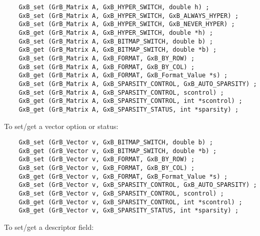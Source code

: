 \documentclass[12pt]{article}
\begin{document}
    {\footnotesize
    \begin{verbatim}
    GxB_set (GrB_Matrix A, GxB_HYPER_SWITCH, double h) ;
    GxB_set (GrB_Matrix A, GxB_HYPER_SWITCH, GxB_ALWAYS_HYPER) ;
    GxB_set (GrB_Matrix A, GxB_HYPER_SWITCH, GxB_NEVER_HYPER) ;
    GxB_get (GrB_Matrix A, GxB_HYPER_SWITCH, double *h) ;
    GxB_set (GrB_Matrix A, GxB_BITMAP_SWITCH, double b) ;
    GxB_get (GrB_Matrix A, GxB_BITMAP_SWITCH, double *b) ;
    GxB_set (GrB_Matrix A, GxB_FORMAT, GxB_BY_ROW) ;
    GxB_set (GrB_Matrix A, GxB_FORMAT, GxB_BY_COL) ;
    GxB_get (GrB_Matrix A, GxB_FORMAT, GxB_Format_Value *s) ;
    GxB_set (GrB_Matrix A, GxB_SPARSITY_CONTROL, GxB_AUTO_SPARSITY) ;
    GxB_set (GrB_Matrix A, GxB_SPARSITY_CONTROL, scontrol) ;
    GxB_get (GrB_Matrix A, GxB_SPARSITY_CONTROL, int *scontrol) ;
    GxB_get (GrB_Matrix A, GxB_SPARSITY_STATUS, int *sparsity) ; \end{verbatim} }

\noindent
To set/get a vector option or status:

    {\footnotesize
    \begin{verbatim}
    GxB_set (GrB_Vector v, GxB_BITMAP_SWITCH, double b) ;
    GxB_get (GrB_Vector v, GxB_BITMAP_SWITCH, double *b) ;
    GxB_set (GrB_Vector v, GxB_FORMAT, GxB_BY_ROW) ;
    GxB_set (GrB_Vector v, GxB_FORMAT, GxB_BY_COL) ;
    GxB_get (GrB_Vector v, GxB_FORMAT, GxB_Format_Value *s) ;
    GxB_set (GrB_Vector v, GxB_SPARSITY_CONTROL, GxB_AUTO_SPARSITY) ;
    GxB_set (GrB_Vector v, GxB_SPARSITY_CONTROL, scontrol) ;
    GxB_get (GrB_Vector v, GxB_SPARSITY_CONTROL, int *scontrol) ;
    GxB_get (GrB_Vector v, GxB_SPARSITY_STATUS, int *sparsity) ; \end{verbatim} }

\noindent
To set/get a descriptor field:
\end{document}

